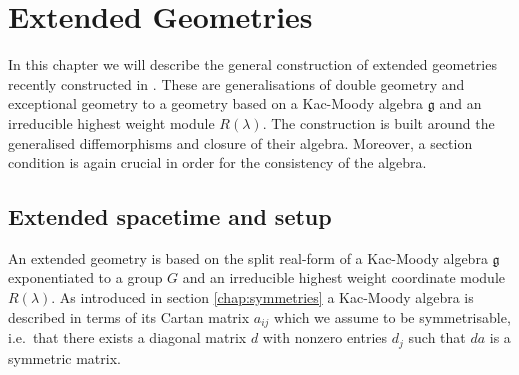 \chapter{Extended Geometries}
In this chapter we will describe the general construction of extended geometries recently constructed in \cite{CederwallPalmkvist2017}. These are generalisations of double geometry and exceptional geometry to a geometry based on a Kac-Moody algebra $\mathfrak{g}$ and an irreducible highest weight module $R(\lambda)$. The construction is built around the generalised diffemorphisms and closure of their algebra. Moreover, a section condition is again crucial in order for the consistency of the algebra. 

\section{Extended spacetime and setup}
An extended geometry is based on the split real-form of a Kac-Moody algebra $\mathfrak{g}$ exponentiated to a group $G$ and an irreducible highest weight coordinate module $R(\lambda)$. As introduced in section \ref{chap:symmetries} a Kac-Moody algebra is described in terms of its Cartan matrix $a_{ij}$ which we assume to be symmetrisable, i.e.\ that there exists a diagonal matrix $d$ with nonzero entries $d_j$ such that $da$ is a symmetric matrix. 

